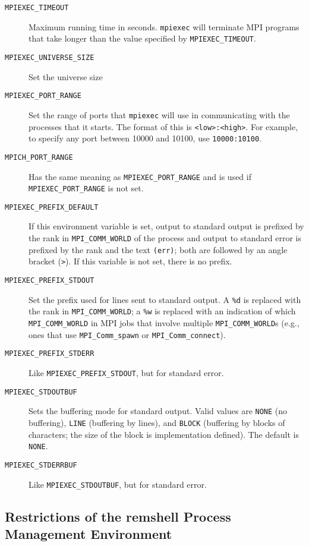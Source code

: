 \documentclass[dvipdfm,11pt]{article}
\begin{document}
\begin{description}
\item[\texttt{MPIEXEC\_TIMEOUT}]Maximum running time in seconds.
\texttt{mpiexec} will terminate MPI programs that take longer than the value
specified by \texttt{MPIEXEC\_TIMEOUT}.  
\item[\texttt{MPIEXEC\_UNIVERSE\_SIZE}]Set the universe size
\item[\texttt{MPIEXEC\_PORT\_RANGE}]Set the range of ports that
\texttt{mpiexec} will use  
  in communicating with the processes that it starts.  The format of 
  this is \texttt{<low>:<high>}.  For example, to specify any port between
  10000 and 10100, use \texttt{10000:10100}.  
\item[\texttt{MPICH\_PORT\_RANGE}]Has the same meaning as
\texttt{MPIEXEC\_PORT\_RANGE} and is used if \texttt{MPIEXEC\_PORT\_RANGE} is
not set. 
\item[\texttt{MPIEXEC\_PREFIX\_DEFAULT}]If this environment variable is set,
output to standard output is prefixed by the rank in \texttt{MPI\_COMM\_WORLD}
of the process and output to standard error is prefixed by the rank and the
text \texttt{(err)}; both are followed by an angle bracket (\texttt{>}).  If 
  this variable is not set, there is no prefix.
\item[\texttt{MPIEXEC\_PREFIX\_STDOUT}]Set the prefix used for lines sent to
standard output.  A \texttt{\%d} is replaced with the rank in
\texttt{MPI\_COMM\_WORLD}; a \texttt{\%w} is replaced with an indication of
which \texttt{MPI\_COMM\_WORLD} in MPI jobs that involve multiple
\texttt{MPI\_COMM\_WORLD}s (e.g., ones that use \texttt{MPI\_Comm\_spawn} or
\texttt{MPI\_Comm\_connect}). 
\item[\texttt{MPIEXEC\_PREFIX\_STDERR}]Like \texttt{MPIEXEC\_PREFIX\_STDOUT},
but for standard error. 
\item[\texttt{MPIEXEC\_STDOUTBUF}]Sets the buffering mode for standard
  output.  Valid  values are \texttt{NONE} (no buffering),
  \texttt{LINE} (buffering by lines), and \texttt{BLOCK} (buffering by
  blocks of characters; the size of the block is implementation
  defined).  The default is \texttt{NONE}. 
\item[\texttt{MPIEXEC\_STDERRBUF}]Like \texttt{MPIEXEC\_STDOUTBUF},
  but for standard error. 
\end{description}

\subsection{Restrictions of the remshell Process Management Environment}
\label{sec:restrictions-remshell}
\end{document}
